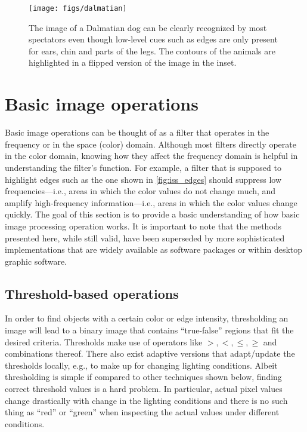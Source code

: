 \begin{figure}[!]
    \centering
    \texttt{[image: figs/dalmatian]}
    \caption{The image of a Dalmatian dog can be clearly recognized by most spectators even though low-level cues such as edges are only present for ears, chin and parts of the legs. The contours of the animals are highlighted in a flipped version of the image in the inset.
    \label{fig:dalmatian}}
\end{figure}

\section{Basic image operations}

Basic image operations can be thought of as a filter that operates in the frequency or in the space (color) domain. Although most filters directly operate in the color domain, knowing how they affect the frequency domain is helpful in understanding the filter's function. For example, a filter that is supposed to highlight edges such as the one shown in \cref{fig:iss_edges} should suppress low frequencies---i.e., areas in which the color values do not change much, and amplify high-frequency information---i.e., areas in which the color values change quickly. The goal of this section is to provide a basic understanding of how basic image processing operation works. It is important to note that the methods presented here, while still valid, have been superseded by more sophisticated implementations that are widely available as software packages or within desktop graphic software.

\subsection{Threshold-based operations}
In order to find objects with a certain color or edge intensity, thresholding an image will lead to a binary image that contains ``true-false'' regions that fit the desired criteria. Thresholds make use of operators like $>,<,\leq,\geq$ and combinations thereof. There also exist adaptive versions that adapt/update the thresholds locally, e.g., to make up for changing lighting conditions.
Albeit thresholding is simple if compared to other techniques shown below, finding correct threshold values is a hard problem. In particular, actual pixel values change drastically with change in the lighting conditions and there is no such thing as ``red'' or ``green'' when inspecting the actual values under different conditions.


